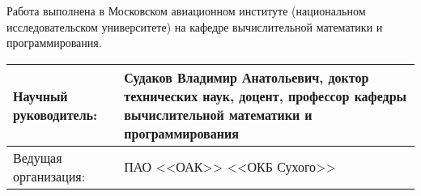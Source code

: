 Работа выполнена в Московском авиационном институте (национальном исследовательском университете) на кафедре вычислительной математики и программирования.

\begin{table}[H]
    \Large
    \begin{tabularx}{\textwidth}{ 
    |>{\arraybackslash}X
    |>{\arraybackslash}X| }

    \hline
    Научный руководитель: & \textbf{Судаков Владимир Анатольевич}, доктор технических наук, доцент, профессор кафедры вычислительной математики и программирования \\
    \hline
    Ведущая организация: & ПАО <<ОАК>> <<ОКБ Сухого>> \\
    \hline
        
    \end{tabularx}
\end{table}


